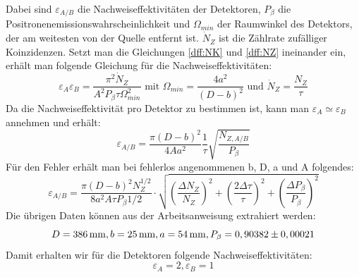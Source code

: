        Dabei sind $\varepsilon_{A/B}$ die Nachweiseffektivitäten der Detektoren, $P_\beta$ die Positronenemissionswahrscheinlichkeit und $\Omega_{min}$ der Raumwinkel des Detektors, der am weitesten von der Quelle entfernt
       ist. $\dot N_Z$ ist die Zählrate zufälliger Koinzidenzen. Setzt man die Gleichungen \ref{dff:NK} und \ref{dff:NZ} ineinander ein, erhält man folgende Gleichung für die Nachweiseffektivitäten:
       $$ \varepsilon_A \varepsilon_B = \frac{\pi^2 \dot N_Z}{A^2 P_\beta \tau \Omega^2_{min}} \text{ mit } \Omega_{min} = \frac{4a^2}{\left(D-b\right)^2 } \text{ und } \dot N_Z = \frac{N_Z}{\tau}$$
       Da die Nachweiseffektivität pro Detektor zu bestimmen ist, kann man $ \varepsilon_A \simeq \varepsilon_B $ annehmen und erhält:
       $$ \varepsilon_{A/B} = \frac{\pi (D-b)^2}{4Aa^2} \frac{1}{\tau} \sqrt{\frac{N_{Z,A/B}}{P_\beta}}$$ 
       Für den Fehler erhält man bei fehlerlos angenommenen b, D, a und A folgendes:
       $$ \varepsilon_{A/B} = \frac{\pi (D-b)^2 N^{1/2}_Z}{8a^2A\tau P_\beta{1/2}} \cdot \sqrt{\left(\frac{\Delta N_Z}{N_Z}\right)^2 + \left(\frac{2\Delta \tau}{\tau}\right)^2 + \left(\frac{\Delta P_\beta}{P_\beta}\right)^2}$$
       Die übrigen Daten können aus der Arbeitsanweisung extrahiert werden:
       $$ D = \unit[386]{mm}, b = \unit[25]{mm}, a = \unit[54]{mm}, P_\beta = 0,90382 \pm 0,00021$$
       Damit erhalten wir für die Detektoren folgende Nachweiseffektivitäten:
       $$ \varepsilon_A = 2, \varepsilon_B = 1$$

